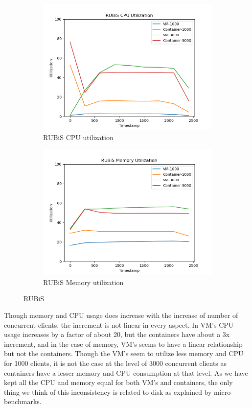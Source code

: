 \documentclass[11pt]{article}
\begin{document}
\begin{figure}[hbt!]
\centering
\begin{subfigure}{.5\textwidth}
  \centering
  \includegraphics[width=1.1\linewidth]{rubis_cpu_util.png}
  \caption{RUBiS CPU utilization}
  \label{fig:rub1}
\end{subfigure}%
\begin{subfigure}{.5\textwidth}
  \centering
  \includegraphics[width=1.1\linewidth]{rubis_mem_util.png}
  \caption{RUBiS Memory utilization}
  \label{fig:rub2}
\end{subfigure}
\caption{RUBiS}
\label{fig:rubis}
\end{figure}

Though memory and CPU usage does increase with the increase of number of concurrent clients, the increment is not linear in every aspect. In VM’s CPU usage increases by a factor of about 20, but the containers have about a 3x increment, and in the case of memory, VM's seems to have a linear relationship but not the containers. Though the VM's seem to utilize less memory and CPU for 1000 clients, it is not the case at the level of 3000 concurrent clients as containers have a lesser memory and CPU consumption at that level. As we have kept all the CPU and memory equal for both VM's and containers, the only thing we think of this inconsistency is related to disk as explained by micro-benchmarks.
\end{document}
